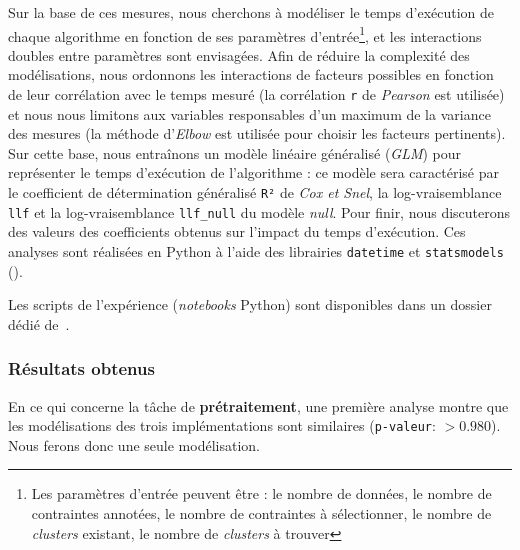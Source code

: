 			Sur la base de ces mesures, nous cherchons à modéliser le temps d'exécution de chaque algorithme en fonction de ses paramètres d'entrée\footnote{Les paramètres d'entrée peuvent être : le nombre de données, le nombre de contraintes annotées, le nombre de contraintes à sélectionner, le nombre de \textit{clusters} existant, le nombre de \textit{clusters} à trouver}, et les interactions doubles entre paramètres sont envisagées.
			Afin de réduire la complexité des modélisations, nous ordonnons les interactions de facteurs possibles en fonction de leur corrélation avec le temps mesuré (la corrélation \texttt{r} de \textit{Pearson} est utilisée) et nous nous limitons aux variables responsables d'un maximum de la variance des mesures (la méthode d'\textit{Elbow} est utilisée pour choisir les facteurs pertinents).
			Sur cette base, nous entraînons un modèle linéaire généralisé (\textit{GLM}) pour représenter le temps d'exécution de l'algorithme : ce modèle sera caractérisé par le coefficient de détermination généralisé \texttt{R²} de \textit{Cox et Snel}, la log-vraisemblance \texttt{llf} et la log-vraisemblance \texttt{llf\_null} du modèle \textit{null}.
			Pour finir, nous discuterons des valeurs des coefficients obtenus sur l'impact du temps d'exécution.
			Ces analyses sont réalisées en Python à l'aide des librairies \texttt{datetime} et \texttt{statsmodels} (\cite{seabold:2010}).
			
			\begin{leftBarInformation}
				Les scripts de l'expérience (\textit{notebooks} Python) sont disponibles dans un dossier dédié de~\cite{schild:cognitivefactory-interactive-clustering-comparative-study:2021}.
			\end{leftBarInformation}

		\subsubsection{Résultats obtenus}
				
			
			En ce qui concerne la tâche de \textbf{prétraitement}, une première analyse montre que les modélisations des trois implémentations sont similaires  (\texttt{p-valeur}: $> 0.980$). Nous ferons donc une seule modélisation.
			
